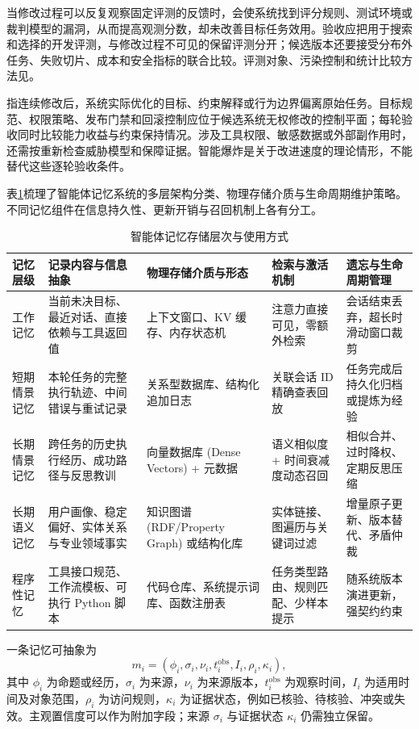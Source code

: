 \documentclass[../textbook.tex]{subfiles}
\begin{document}
当修改过程可以反复观察固定评测的反馈时，会使系统找到评分规则、测试环境或裁判模型的漏洞，从而提高观测分数，却未改善目标任务效用。验收应把用于搜索和选择的开发评测，与修改过程不可见的保留评测分开；候选版本还要接受分布外任务、失败切片、成本和安全指标的联合比较。评测对象、污染控制和统计比较方法见。

指连续修改后，系统实际优化的目标、约束解释或行为边界偏离原始任务。目标规范、权限策略、发布门禁和回滚控制应位于候选系统无权修改的控制平面；每轮验收同时比较能力收益与约束保持情况。涉及工具权限、敏感数据或外部副作用时，还需按重新检查威胁模型和保障证据。智能爆炸是关于改进速度的理论情形，不能替代这些逐轮验收条件。

表\ref{tab:agent-memory-taxonomy}梳理了智能体记忆系统的多层架构分类、物理存储介质与生命周期维护策略。不同记忆组件在信息持久性、更新开销与召回机制上各有分工。

\begin{table}[htbp]
\centering
\caption{智能体记忆存储层次与使用方式}
\label{tab:agent-memory-taxonomy}
\begin{tabularx}{\linewidth}{@{}lXXXX@{}}
\toprule
记忆层级 & 记录内容与信息抽象 & 物理存储介质与形态 & 检索与激活机制 & 遗忘与生命周期管理 \\
\midrule
工作记忆 & 当前未决目标、最近对话、直接依赖与工具返回值 & 上下文窗口、KV 缓存、内存状态机 & 注意力直接可见，零额外检索 & 会话结束丢弃，超长时滑动窗口裁剪 \\
短期情景记忆 & 本轮任务的完整执行轨迹、中间错误与重试记录 & 关系型数据库、结构化追加日志 & 关联会话 ID 精确查表回放 & 任务完成后持久化归档或提炼为经验 \\
长期情景记忆 & 跨任务的历史执行经历、成功路径与反思教训 & 向量数据库 (Dense Vectors) + 元数据 & 语义相似度 + 时间衰减度动态召回 & 相似合并、过时降权、定期反思压缩 \\
长期语义记忆 & 用户画像、稳定偏好、实体关系与专业领域事实 & 知识图谱 (RDF/Property Graph) 或结构化库 & 实体链接、图遍历与关键词过滤 & 增量原子更新、版本替代、矛盾仲裁 \\
程序性记忆 & 工具接口规范、工作流模板、可执行 Python 脚本 & 代码仓库、系统提示词库、函数注册表 & 任务类型路由、规则匹配、少样本提示 & 随系统版本演进更新，强契约约束 \\
\bottomrule
\end{tabularx}
\end{table}

一条记忆可抽象为
\begin{equation}
 m_i=(\phi_i,\sigma_i,\nu_i,t_i^{\mathrm{obs}},I_i,\rho_i,\kappa_i),
\end{equation}
其中 $\phi_i$ 为命题或经历，$\sigma_i$ 为来源，$\nu_i$ 为来源版本，$t_i^{\mathrm{obs}}$ 为观察时间，$I_i$ 为适用时间及对象范围，$\rho_i$ 为访问规则，$\kappa_i$ 为证据状态，例如已核验、待核验、冲突或失效。主观置信度可以作为附加字段；来源 $\sigma_i$ 与证据状态 $\kappa_i$ 仍需独立保留。
\end{document}
